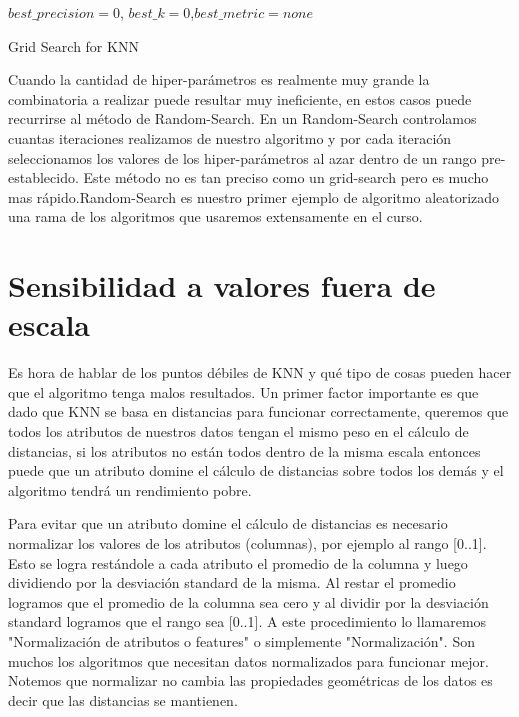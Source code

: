 \begin{algorithm}
$best\_precision = 0$, $best\_k=0$,$ best\_metric=none$\;
 \caption{Grid Search for KNN}
\end{algorithm}

Cuando la cantidad de hiper-parámetros es realmente muy grande la combinatoria a realizar puede resultar muy ineficiente, en estos casos puede recurrirse al método de Random-Search. En un Random-Search controlamos cuantas iteraciones realizamos de nuestro algoritmo y por cada iteración seleccionamos los valores de los hiper-parámetros al azar dentro de un rango pre-establecido. Este método no es tan preciso como un grid-search pero es mucho mas rápido.Random-Search es nuestro primer ejemplo de algoritmo aleatorizado una rama de los algoritmos que usaremos extensamente en el curso.

\section{Sensibilidad a valores fuera de escala}

Es hora de hablar de los puntos débiles de KNN y qué tipo de cosas pueden hacer que el algoritmo tenga malos resultados. Un primer factor importante es que dado que KNN se basa en distancias para funcionar correctamente, queremos que todos los atributos de nuestros datos tengan el mismo peso en el cálculo de distancias, si los atributos no están todos dentro de la misma escala entonces puede que un atributo domine el cálculo de distancias sobre todos los demás y el algoritmo tendrá un rendimiento pobre. 

Para evitar que un atributo domine el cálculo de distancias es necesario normalizar los valores de los atributos (columnas), por ejemplo al rango [0..1]. Esto se logra restándole a cada atributo el promedio de la columna y luego dividiendo por la desviación standard de la misma. Al restar el promedio logramos que el promedio de la columna sea cero y al dividir por la desviación standard logramos que el rango sea [0..1]. A este procedimiento lo llamaremos "Normalización de atributos o features" o simplemente "Normalización". Son muchos los algoritmos que necesitan datos normalizados para funcionar mejor. Notemos que normalizar no cambia las propiedades geométricas de los datos es decir que las distancias se mantienen.

